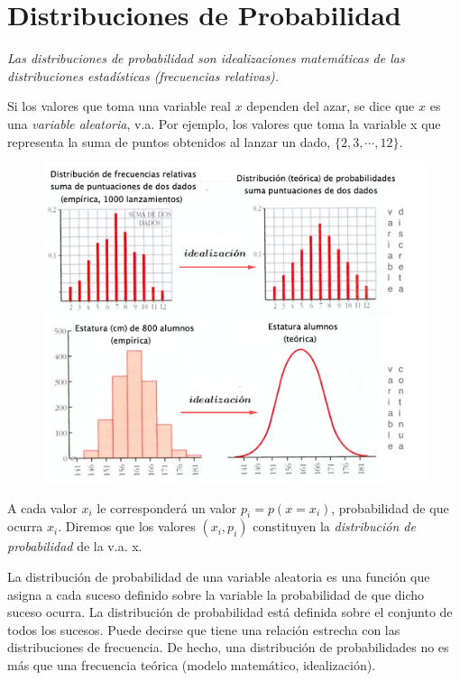 \chapter{Distribuciones de Probabilidad}\label{distprob}



\emph{Las distribuciones de probabilidad son idealizaciones matemáticas de las distribuciones estadísticas (frecuencias relativas).}

Si los valores que toma una variable real $x$ dependen del azar, se dice que $x$ es una \emph{variable aleatoria}, v.a. Por ejemplo, los valores que toma la variable x que representa la suma de puntos obtenidos al lanzar un dado, $\{2,3,\cdots,12\}$.



	\begin{figure}[H]
	\centering
	\includegraphics[width=.85\textwidth]{imagenes/imagenes04/T04IM01.png}
	\end{figure}


A cada valor $x_i$ le corresponderá un valor $p_i=p(x=x_i)$, probabilidad de que ocurra $x_i$. Diremos que los valores $(x_i, p_i)$ constituyen la \emph{distribución de probabilidad} de la v.a. x.

La distribución de probabilidad de una variable aleatoria es una función que asigna a cada suceso definido sobre la variable la probabilidad de que dicho suceso ocurra. La distribución de probabilidad está definida sobre el conjunto de todos los sucesos. Puede decirse que tiene una relación estrecha con las distribuciones de frecuencia. De hecho, una distribución de probabilidades no es más que una frecuencia teórica (modelo matemático, idealización).

